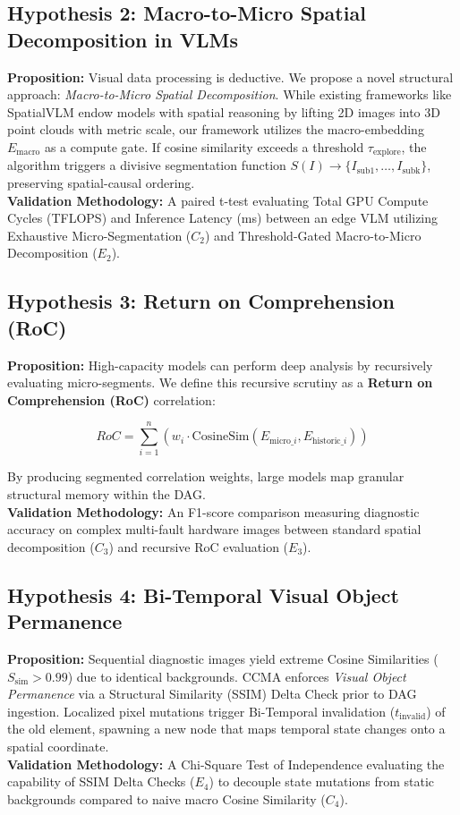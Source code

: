 \documentclass[11pt, a4paper]{article}
\begin{document}
	\subsection{Hypothesis 2: Macro-to-Micro Spatial Decomposition in VLMs}
	\textbf{Proposition:} Visual data processing is deductive. We propose a novel structural approach: \textit{Macro-to-Micro Spatial Decomposition}. While existing frameworks like SpatialVLM \cite{chen2024spatialvlm} endow models with spatial reasoning by lifting 2D images into 3D point clouds with metric scale, our framework utilizes the macro-embedding $E_{\text{macro}}$ as a compute gate. If cosine similarity exceeds a threshold $\tau_{\text{explore}}$, the algorithm triggers a divisive segmentation function $S(I) \to \{I_{\text{sub1}}, \dots, I_{\text{subk}}\}$, preserving spatial-causal ordering.\\
	\textbf{Validation Methodology:} A paired t-test evaluating Total GPU Compute Cycles (TFLOPS) and Inference Latency (ms) between an edge VLM utilizing Exhaustive Micro-Segmentation ($C_2$) and Threshold-Gated Macro-to-Micro Decomposition ($E_2$).
	
	\subsection{Hypothesis 3: Return on Comprehension (RoC)}
	\textbf{Proposition:} High-capacity models can perform deep analysis by recursively evaluating micro-segments. We define this recursive scrutiny as a \textbf{Return on Comprehension (RoC)} correlation:
	
	\begin{equation}
		RoC = \sum_{i=1}^{n} \left( w_i \cdot \text{CosineSim}(E_{\text{micro\_}i}, E_{\text{historic\_}i}) \right)
	\end{equation}
	
	By producing segmented correlation weights, large models map granular structural memory within the DAG.\\
	\textbf{Validation Methodology:} An F1-score comparison measuring diagnostic accuracy on complex multi-fault hardware images between standard spatial decomposition ($C_3$) and recursive RoC evaluation ($E_3$).
	
	\subsection{Hypothesis 4: Bi-Temporal Visual Object Permanence}
	\textbf{Proposition:} Sequential diagnostic images yield extreme Cosine Similarities ($S_{\text{sim}} > 0.99$) due to identical backgrounds. CCMA enforces \textit{Visual Object Permanence} via a Structural Similarity (SSIM) Delta Check \cite{wang2004ssim} prior to DAG ingestion. Localized pixel mutations trigger Bi-Temporal invalidation ($t_{\text{invalid}}$) of the old element, spawning a new node that maps temporal state changes onto a spatial coordinate.\\
	\textbf{Validation Methodology:} A Chi-Square Test of Independence evaluating the capability of SSIM Delta Checks ($E_4$) to decouple state mutations from static backgrounds compared to naive macro Cosine Similarity ($C_4$).
	
\end{document}
